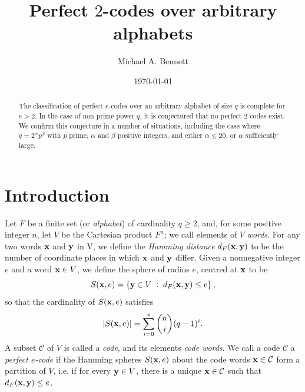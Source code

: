 \documentclass{amsart}
\begin{document}
\newtheorem{thm}{Theorem}
\newtheorem{lem}{Lemma}[section]
\newtheorem{prop}[lem]{Proposition}
\newtheorem{alg}[lem]{Algorithm}
\newtheorem{cor}[lem]{Corollary}
\newtheorem*{conj}{Conjecture}

\theoremstyle{definition}

\newtheorem{ex}[thm]{Example}

\theoremstyle{remark}
\newtheorem{rem}[thm]{Remark}

\newtheorem{ack}{Acknowledgement}

\title[Perfect $2$-codes over arbitrary alphabets]
{Perfect $2$-codes over arbitrary alphabets}


\author[Michael Bennett]{Michael A. Bennett}
\address{Department of Mathematics, University of British Columbia, Vancouver, B.C., V6T 1Z2 Canada}



\date{\today}


\begin {abstract}
The classification of  perfect $e$-codes over an arbitrary alphabet of size $q$ is complete for $e > 2$. In the case of non prime power $q$, it is conjectured that no perfect $2$-codes exist. We confirm this conjecture in a number of situations, including the case where $q=2^\alpha p^\beta$ with $p$ prime, $\alpha$ and $\beta$ positive integers, and either $\alpha \leq 20$, or $\alpha$ sufficiently large.
\end {abstract}
\maketitle

\section{Introduction}

Let $F$ be a finite set (or {\it alphabet}) of cardinality $q \geq 2$, and, for some positive integer $n$, let $V$ be the Cartesian product $F^n$; we call elements of $V$ {\it words}. For any two words ${\bf{x}}$ and ${\bf{y}}$ in V, we define the {\it Hamming distance} $d_F ({\bf{x}}, {\bf{y}})$  to be the number of coordinate places in which ${\bf{x}}$ and ${\bf{y}}$ differ. Given a nonnegative integer $e$ and a word ${\bf{x}} \in V$, we define the sphere of radius $e$, centred at ${\bf{x}}$ to be
$$
S({\bf{x}},e) = \left\{ {\bf{y}} \in V \; : \; d_F ({\bf{x}}, {\bf{y}}) \leq e \right\},
$$
so that the cardinality of $S({\bf{x}},e)$ satisfies
$$
|S({\bf{x}},e)| = \sum_{i=0}^e \binom{n}{i} (q-1)^i.
$$
A subset $\mathcal{C}$ of $V$ is called a {\it code}, and its elements {\it code words}. We call a code $\mathcal{C}$ a {\it perfect $e$-code} if the Hamming spheres $S({\bf{x}},e)$ about the code words ${\bf{x}} \in \mathcal{C}$ form a partition of $V$, i.e. if for every ${\bf{y}} \in V$, there is a unique ${\bf{x}} \in \mathcal{C}$ such that $d_F ({\bf{x}}, {\bf{y}}) \leq e$.
\end{document}
